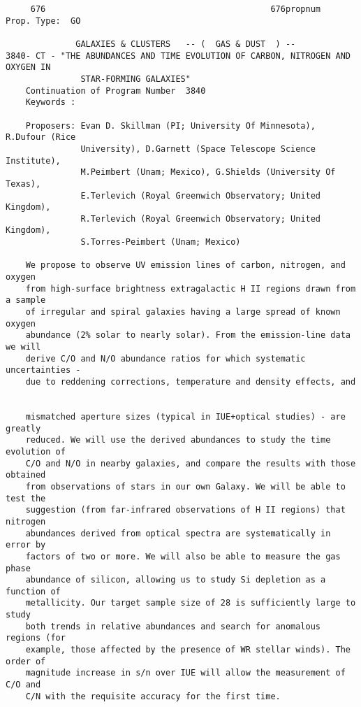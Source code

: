 \begin{footnotesize}
\begin{verbatim}
     676                                             676propnum                
Prop. Type:  GO                                                                

              GALAXIES & CLUSTERS   -- (  GAS & DUST  ) -- 
3840- CT - "THE ABUNDANCES AND TIME EVOLUTION OF CARBON, NITROGEN AND OXYGEN IN
               STAR-FORMING GALAXIES"          
    Continuation of Program Number  3840       
    Keywords :  

    Proposers: Evan D. Skillman (PI; University Of Minnesota), R.Dufour (Rice 
               University), D.Garnett (Space Telescope Science Institute), 
               M.Peimbert (Unam; Mexico), G.Shields (University Of Texas), 
               E.Terlevich (Royal Greenwich Observatory; United Kingdom), 
               R.Terlevich (Royal Greenwich Observatory; United Kingdom), 
               S.Torres-Peimbert (Unam; Mexico)   

    We propose to observe UV emission lines of carbon, nitrogen, and oxygen 
    from high-surface brightness extragalactic H II regions drawn from a sample
    of irregular and spiral galaxies having a large spread of known oxygen  
    abundance (2% solar to nearly solar). From the emission-line data we will 
    derive C/O and N/O abundance ratios for which systematic uncertainties -
    due to reddening corrections, temperature and density effects, and     


    mismatched aperture sizes (typical in IUE+optical studies) - are greatly 
    reduced. We will use the derived abundances to study the time evolution of
    C/O and N/O in nearby galaxies, and compare the results with those obtained
    from observations of stars in our own Galaxy. We will be able to test the 
    suggestion (from far-infrared observations of H II regions) that nitrogen 
    abundances derived from optical spectra are systematically in error by
    factors of two or more. We will also be able to measure the gas phase 
    abundance of silicon, allowing us to study Si depletion as a function of 
    metallicity. Our target sample size of 28 is sufficiently large to study 
    both trends in relative abundances and search for anomalous regions (for
    example, those affected by the presence of WR stellar winds). The order of
    magnitude increase in s/n over IUE will allow the measurement of C/O and
    C/N with the requisite accuracy for the first time.      
                                                                      
\end{verbatim}
\end{footnotesize}


